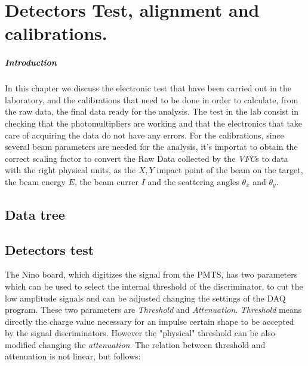 \chapter{Detectors Test, alignment and calibrations.} \label{analysis}

\paragraph{Introduction}
In this chapter we discuss the electronic test that have been carried out in the laboratory, and the calibrations that need to be done
in order to calculate, from the raw data, the final data ready for the analysis.
The test in the lab consist in checking that the photomultipliers are working and that the electronics that take care of acquiring the data do not have any errors.
For the calibrations, since several beam parameters are needed for the analysis, it's importat to obtain the correct scaling factor to convert the Raw Data collected by the \textit{VFC}s to data with the right physical units, as the $X,Y$ impact point of the beam on the target, the beam energy $E$, the beam currer $I$ and the scattering angles $\theta_{x}$ and $\theta_{y}$.

\section{Data tree}

\section{Detectors test}


The Nino board, which digitizes the signal from the PMTS, has two parameters which can be used to select the internal threshold of the discriminator, to cut the low amplitude signals and can be adjusted changing the settings of the DAQ program. These two parameters are \textit{Threshold} and \textit{Attenuation}. \textit{Threshold} means directly the charge value necessary for an impulse certain shape to be accepted by the signal discriminators. However the "physical" threshold can be also modified changing the \textit{attenuation}. The relation between threshold and attenuation is not linear, but follows:

